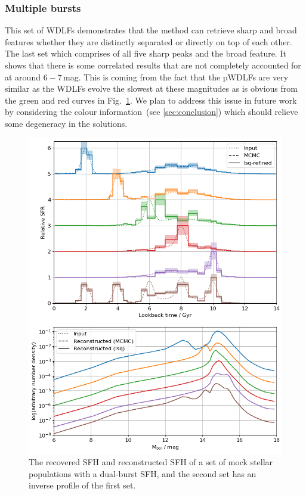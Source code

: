 \documentclass[fleqn,usenatbib]{mnras}
\begin{document}
\subsubsection*{Multiple bursts}
This set of WDLFs demonstrates that the method can retrieve sharp and
broad features whether they are distinctly separated or directly on top of each
other. The last set which comprises of all five sharp peaks and the broad
feature. It shows that there is some correlated results that are not completely
accounted for at around $6-7$\,mag. This is coming from the fact that the
pWDLFs are very similar as the WDLFs evolve the slowest at these magnitudes as
is obvious from the green and red curves in Fig.~\ref{fig:bursts_sfh}. We plan
to address this issue in future work by considering the colour
information~(see \ref{sec:conclusion}) which should relieve some degeneracy in
the solutions.

\begin{figure}
  \includegraphics[width=\columnwidth]{figures/fig_02_two_bursts_wdlf.png} 
  \caption{The recovered SFH and reconstructed SFH of a set of mock stellar
  populations with a dual-burst SFH, and the second set has an inverse profile
  of the first set.}
  \label{fig:bursts_sfh}
\end{figure}
\end{document}
